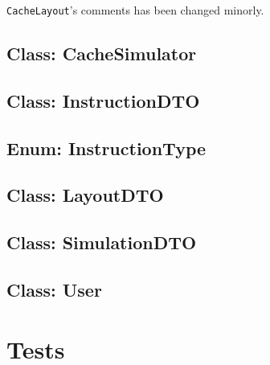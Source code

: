\documentclass[a4paper]{scrreprt}
\begin{document}
\texttt{CacheLayout}'s comments has been changed minorly.



\subsection{Class: CacheSimulator}
\label{subsec:cachesimulator.java}



\subsection{Class: InstructionDTO}
\label{subsec:instructiondto.java}



\subsection{Enum: InstructionType}
\label{subsec:instructiontype.java}



\subsection{Class: LayoutDTO}
\label{subsec:layoutdto.java}



\subsection{Class: SimulationDTO}
\label{subsec:simulationdto.java}



\subsection{Class: User}
\label{subsec:user.java}


\section{Tests}
\end{document}
